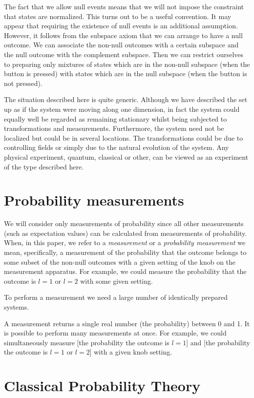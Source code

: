 \documentclass[12pt]{article}
\begin{document}
The fact that we allow null events means that we will not impose the
constraint that states are normalized.  This turns out to be a useful
convention.  It may appear that requiring the existence of null events
is an additional assumption.  However, it follows from the subspace
axiom that we can arrange to have a null outcome.
We can associate the non-null outcomes with a certain subspace and the
null outcome with the complement subspace.  Then we can restrict
ourselves to preparing only mixtures of states which are in the non-null
subspace (when the button is pressed) with states which are in the
null subspace (when the button is not pressed).

The situation described here is quite generic.  Although we have described
the set up as if the system were moving along one dimension, in fact the
system
could equally well be regarded as remaining stationary whilst being
subjected to transformations and measurements. Furthermore, the system
need not be localized but could be in several locations. The
transformations could be due to controlling fields or simply due to the
natural evolution of the system. Any physical experiment, quantum,
classical or other, can be viewed as an experiment of the type described here.


\section{Probability measurements}


We will consider only measurements of probability since all other
measurements (such as expectation values) can be calculated from
measurements of probability.  When, in this paper, we refer to a {\it
measurement} or a {\it probability measurement} we mean, specifically, a
measurement of the probability that the outcome belongs to some subset
of the non-null outcomes with a given setting of the knob on the
measurement apparatus.  For example, we could measure the probability
that the outcome is $l=1$ or $l=2$ with some given setting.

To perform a measurement we need a large number of identically prepared
systems.

A measurement returns a single real number (the probability)
between 0 and 1.  It is possible to perform many measurements at once.
For example, we could simultaneously measure [the probability the
outcome is $l=1$] and [the probability the outcome is $l=1$ or $l=2$]
with a given knob setting.

\section{Classical Probability Theory}
\end{document}

